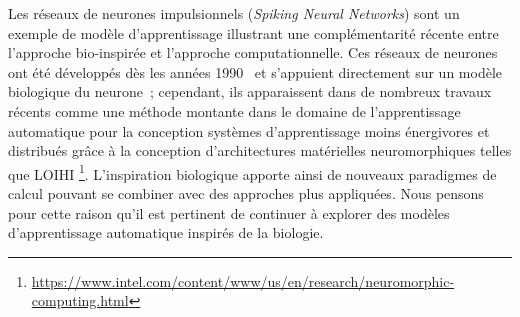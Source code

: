 Les réseaux de neurones impulsionnels (\emph{Spiking Neural Networks}) sont un exemple de modèle d'apprentissage illustrant une complémentarité récente entre l'approche bio-inspirée et l'approche computationnelle. Ces réseaux de neurones ont été développés dès les années 1990~\cite{Maass1996NetworksOS} et s'appuient directement sur un modèle biologique du neurone~; cependant, ils apparaissent dans de nombreux travaux récents comme une méthode montante dans le domaine de l'apprentissage automatique pour la conception systèmes d'apprentissage moins énergivores et distribués grâce à la conception d'architectures matérielles neuromorphiques telles que LOIHI \footnote{\url{https://www.intel.com/content/www/us/en/research/neuromorphic-computing.html}}.
L'inspiration biologique apporte ainsi de nouveaux paradigmes de calcul pouvant se combiner avec des approches plus appliquées. Nous pensons pour cette raison qu'il est pertinent de continuer à explorer des modèles d'apprentissage automatique inspirés de la biologie.

